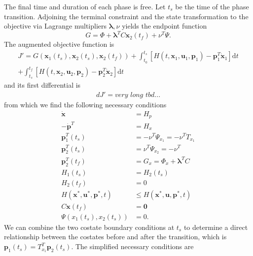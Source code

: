\documentclass[]{article}
\newcommand{\state}{\ensuremath{\mathbf{x}}}
\newcommand{\control}{\ensuremath{\mathbf{u}}}
\newcommand{\costate}{\mathbf{p}}
\newcommand{\multiplier}{\mathbf{\lambda}}
\begin{document}
The final time and duration of each phase is free. Let $t_s$ be the time of the phase transition. Adjoining the terminal constraint and the state transformation to the objective via Lagrange multipliers $\multiplier, \nu$ yields the endpoint function 
\begin{equation}
G = \Phi + \multiplier^TC\state_2(t_f) + \nu^T\Psi.
\end{equation} 
The augmented objective function is 
\begin{align}
J' = G(\state_1(t_s), \state_2(t_s), \state_2(t_f)) + \int_{t_0}^{t_s}\left[H(t,\state_1,\control_1,\costate_1) - \costate_1^T\dot{\state}_1\right]\mathrm{d}t \\
+ \int_{t_s}^{t_f}\left[H(t,\state_2,\control_2,\costate_2) - \costate_2^T\dot{\state}_2\right]\mathrm{d}t \nonumber
\end{align}
and its first differential is
\begin{align}
dJ' = very\,\,long\,\,tbd...
\end{align}
from which we find the following necessary conditions
\begin{align}
\dot{\state} &= H_p \\
-\dot{\costate}^T &= H_x \\
\costate_1^T(t_s) &= -\nu^T\Psi_{x_1} = -\nu^TT_{x_1}\\
\costate_2^T(t_s) &= \nu^T\Psi_{x_2} = -\nu^T\\
\costate_2^T(t_f) &= G_x =\Phi_x + \multiplier^TC\\
H_1(t_s) &= H_2(t_s) \\
H_2(t_f) &= 0 \\
H(\state^*,\control^*,\costate^*, t) &\le H(\state^*,\control,\costate^*, t) \\
C\state(t_f) &= \mathbf{0} \\
\Psi(x_1(t_s),x_2(t_s)) &= 0.
\end{align}
 We can combine the two costate boundary conditions at $t_s$ to determine a direct relationship between the costates before and after the transition, which is $\costate_1(t_s) = T_{x_1}^T\costate_2(t_s)$.
The simplified necessary conditions are 
\end{document}
